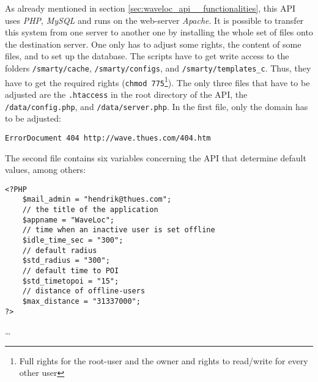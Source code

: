 As  already mentioned in section \ref{sec:waveloc_api__functionalities}, this API uses \emph{PHP}, \emph{MySQL} and runs on the web-server \emph{Apache}. It is possible to transfer this system from one server to another one by installing the whole set of files onto the destination server. One only has to adjust some rights, the content of some files, and to set up the database. The scripts have to get write access to the folders \texttt{/smarty/cache}, \texttt{/smarty/configs}, and \texttt{/smarty/templates\_c}. Thus, they have to get the required rights (\texttt{chmod 775}\footnote{Full rights for the root-user and the owner and rights to read/write for every other user}). The only three files that have to be adjusted are the \texttt{.htaccess} in the root directory of the API, the \texttt{/data/config.php}, and  \texttt{/data/server.php}. In the first file, only the domain has to be adjusted:

\begin{lstlisting}
ErrorDocument 404 http://wave.thues.com/404.htm
\end{lstlisting}

\pagebreak
The second file contains six variables concerning the API that determine default values, among others:

\begin{lstlisting}
<?PHP
	$mail_admin = "hendrik@thues.com";
	// the title of the application
	$appname = "WaveLoc";
	// time when an inactive user is set offline
	$idle_time_sec = "300";
	// default radius
	$std_radius = "300";
	// default time to POI
	$std_timetopoi = "15";
	// distance of offline-users 
	$max_distance = "31337000";
?>
\end{lstlisting}

\ldots{}